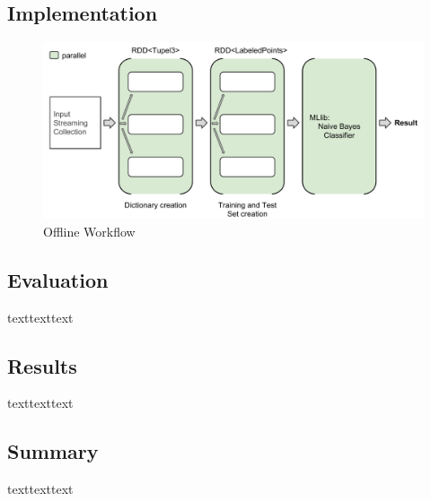 \documentclass[12pt]{article}
\begin{document}
\newpage
\subsection{Implementation}

\begin{figure}[htbp]
  \centering
  \includegraphics[scale=0.56]{VisualisationOfflineWorkflow.pdf}
  \caption{Offline Workflow}
\end{figure}

\subsection{Evaluation}
texttexttext

\subsection{Results}
texttexttext

\subsection{Summary}
texttexttext




\newpage
\medskip

\end{document}

